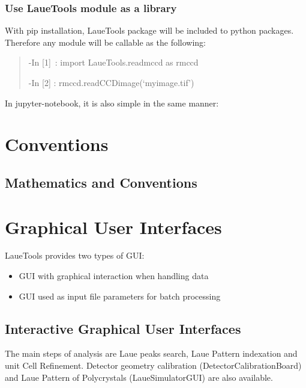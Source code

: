 \documentclass[letterpaper,10pt,english]{sphinxmanual}
\begin{document}
\subsection{Use LaueTools module as a library}
\label{\detokenize{getStarted:use-lauetools-module-as-a-library}}
With pip installation, LaueTools package will be included to python packages. Therefore any module will be callable as the following:
\begin{quote}

-In {[}1{]} : import LaueTools.readmccd as rmccd

-In {[}2{]} : rmccd.readCCDimage(‘myimage.tif’)
\end{quote}

In jupyter-notebook, it is also simple in the same manner:
\begin{quote}

\noindent{}
\end{quote}


\chapter{Conventions}
\label{\detokenize{conventions::doc}}\label{\detokenize{conventions:conventions}}

\section{Mathematics and Conventions}
\label{\detokenize{conventions:mathematics-and-conventions}}

\chapter{Graphical User Interfaces}
\label{\detokenize{GUIs::doc}}\label{\detokenize{GUIs:guis}}\label{\detokenize{GUIs:graphical-user-interfaces}}
LaueTools provides two types of GUI:
\begin{itemize}
\item {} 
GUI with graphical interaction when handling data

\item {} 
GUI used as input file parameters for batch processing

\end{itemize}


\section{Interactive Graphical User Interfaces}
\label{\detokenize{GUIs:interactive-graphical-user-interfaces}}
The main steps of analysis are Laue peaks search, Laue Pattern indexation and unit Cell Refinement. Detector geometry calibration (DetectorCalibrationBoard) and Laue Pattern of Polycrystals (LaueSimulatorGUI) are also available.
\end{document}
